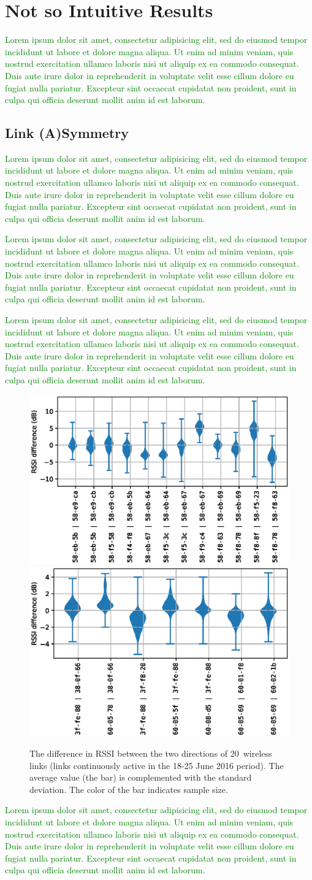\documentclass{elsarticle}
\newcommand{\lorem}          {\textcolor{green}{Lorem ipsum dolor sit amet, consectetur adipisicing elit, sed do eiusmod tempor incididunt ut labore et dolore magna aliqua. Ut enim ad minim veniam, quis nostrud exercitation ullamco laboris nisi ut aliquip ex ea commodo consequat. Duis aute irure dolor in reprehenderit in voluptate velit esse cillum dolore eu fugiat nulla pariatur. Excepteur sint occaecat cupidatat non proident, sunt in culpa qui officia deserunt mollit anim id est laborum.}}
\begin{document}
\section{Not so Intuitive Results}
\label{sec:notsointuitive}

\lorem

\subsection{Link (A)Symmetry}
\label{sec:symmetry}


\lorem


\lorem


\lorem
\begin{figure}
    \includegraphics[width=0.5\columnwidth]{asymmetry.eps}
    \includegraphics[width=0.5\columnwidth]{asymmetry_peach.eps}
    \caption{
        The difference in RSSI between the two directions of 20~wireless links
        (links continuously active in the 18-25 June 2016 period).
        The average value (the bar) is complemented with the standard deviation.
        The color of the bar indicates sample size.
    }
    \label{fig:tab_symmetry}
\end{figure}


\lorem
\end{document}
